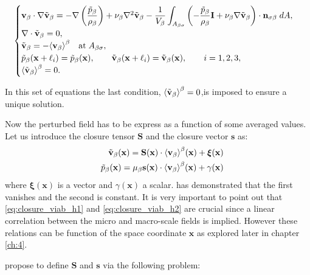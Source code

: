 \begin{eqnarray}
\begin{cases}
\textbf{v}_{\beta} \cdot \nabla \tilde{\textbf{v}}_{\beta} = -\nabla \left(\dfrac{\tilde{p}_{\beta}}{\rho_{\beta}}\right) + \nu_{\beta} \nabla^2 \tilde{\textbf{v}}_{\beta} - \dfrac{1}{V_\beta} \displaystyle \int_{A_{\beta \sigma}} \left(-\dfrac{\tilde{p}_{\beta}}{\rho_{\beta}} \mathbf{I}  + \nu_{\beta} \nabla \tilde{\textbf{v}}_{\beta} \right) \cdot \mathbf{n}_{\sigma \beta} \;dA,  \\
\nabla \cdot \tilde{\textbf{v}}_{\beta} = 0, \\
\tilde{\textbf{v}}_{\beta} = -{\left< \textbf{v}_{\beta} \right>}^{\beta} \quad \textrm{at} \; A_{\beta \sigma}, \\
\tilde{p}_{\beta}(\mathbf{x} +\ell_i) = \tilde{p}_{\beta}(\mathbf{x}), \qquad \tilde{\textbf{v}}_{\beta}(\mathbf{x} +\ell_i) = \tilde{\textbf{v}}_{\beta}(\mathbf{x}), \qquad i=1,2,3 ,\\
{\left< \tilde{\textbf{v}}_{\beta} \right>}^{\beta} = 0.
\end{cases}
\label{eq:vans_mom_2}
\end{eqnarray}

In this set of equations the last condition, ${\left< \tilde{\textbf{v}}_{\beta} \right>}^{\beta} = 0$,is imposed to ensure a unique solution.

Now the perturbed field has to be express as a function of some averaged values. Let us introduce the closure tensor $\mathbf{S}$ and  the closure vector $\mathbf{s}$ as:
\begin{eqnarray}
&& \tilde{\textbf{v}}_{\beta}(\mathbf{x}) = \mathbf{S}(\mathbf{x})  \cdot {\left< \textbf{v}_{\beta}\right>}^{\beta}(\mathbf{x})  +\boldsymbol{\xi}(\mathbf{x})  	\label{eq:closure_viab_h1} \\
&& \tilde{p}_{\beta}(\mathbf{x})  = \mu_{\beta} \mathbf{s}(\mathbf{x})  \cdot {\left< \textbf{v}_{\beta}\right>}^{\beta}(\mathbf{x})  + \gamma(\mathbf{x}) \label{eq:closure_viab_h2}
\end{eqnarray}
where $\boldsymbol{\xi}(\mathbf{x})$ is a vector and $\gamma(\mathbf{x})$ a scalar. \citet{whitaker1996forchheimer} has demonstrated that the first vanishes and the second is constant.
It is very important to point out that \eqref{eq:closure_viab_h1} and \eqref{eq:closure_viab_h2} are crucial since a linear correlation between the micro and macro-scale fields is implied.
However these relations can be function of the space coordinate $\mathbf{x}$ as explored later in chapter \ref{ch:4}.

\citet{whitaker1996forchheimer} propose to define $\mathbf{S}$ and $\mathbf{s}$ via the following problem:

